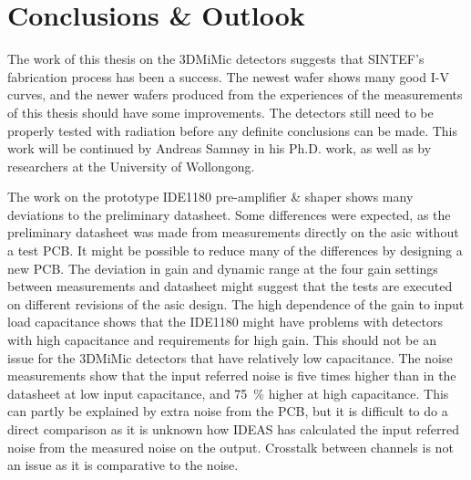 \documentclass[../main/thesis.tex]{subfiles}
\begin{document}
\newchapter

\chapter*{Conclusions \& Outlook}
\label{conc}

The work of this thesis on the 3DMiMic detectors suggests that SINTEF's fabrication process has been a success. The newest wafer shows many good I-V curves, and the newer wafers produced from the experiences of the measurements of this thesis should have some improvements. The detectors still need to be properly tested with radiation before any definite conclusions can be made. This work will be continued by Andreas Samnøy in his Ph.D. work, as well as by researchers at the University of Wollongong. 

The work on the prototype IDE1180 pre-amplifier \& shaper shows many deviations to the preliminary datasheet. Some differences were expected, as the preliminary datasheet was made from measurements directly on the \gls{asic} without a test \gls{PCB}. It might be possible to reduce many of the differences by designing a new PCB. The deviation in gain and dynamic range at the four gain settings between measurements and datasheet might suggest that the tests are executed on different revisions of the \gls{asic} design. The high dependence of the gain to input load capacitance shows that the IDE1180 might have problems with detectors with high capacitance and requirements for high gain. This should not be an issue for the 3DMiMic detectors that have relatively low capacitance. The noise measurements show that the input referred noise is five times higher than in the datasheet at low input capacitance, and 75~\% higher at high capacitance. This can partly be explained by extra noise from the \gls{PCB}, but it is difficult to do a direct comparison as it is unknown how IDEAS has calculated the input referred noise from the measured noise on the output. Crosstalk between channels is not an issue as it is comparative to the noise.
\end{document}
